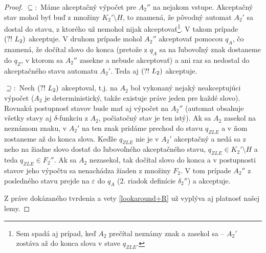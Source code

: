 \begin{proof}
$\subseteq :$ Máme akceptačný výpočet pre $A_2''$ na nejakom vstupe. Akceptačný stav mohol byť buď z množiny $K_2'\setminus H$, to znamená, že pôvodný automat $A_2'$ sa dostal do stavu, z ktorého už nemohol nijak akceptovať\footnote{Sem spadá aj prípad, keď $A_2$ prečítal neznámy znak a zasekol sa -- $A_2'$ zostáva až do konca slova v stave $q_{ZLE}$.}. V takom prípade $\text{(?!~} L_2)$ akceptuje. V druhom prípade mohol $A_2''$ akceptovať pomocou $q_A$, čo znamená, že dočítal slovo do konca (pretože z $q_A$ sa na ľubovoľný znak dostaneme do $q_Z$, v ktorom sa $A_2''$ zasekne a nebude akceptovať) a ani raz sa nedostal do akceptačného stavu automatu $A_2'$. Teda aj $\text{(?!~} L_2)$ akceptuje.

$\supseteq :$ Nech $\text{(?!~} L_2)$ akceptoval, t.j. na $A_2$ bol vykonaný nejaký neakceptujúci výpočet ($A_2$ je deterministický, takže existuje práve jeden pre každé slovo). Rovnakú postupnosť stavov bude mať aj výpočet na $A_2''$ (automat obsahuje všetky stavy aj $\delta$-funkciu z $A_2$, počiatočný stav je ten istý). Ak sa $A_2$ zasekol na neznámom znaku, v $A_2'$ na ten znak pridáme prechod do stavu $q_{ZLE}$ a v ňom zostaneme až do konca slova. Keďže $q_{ZLE}$ nie je v $A_2'$ akceptačný a nedá sa z neho na žiadne slovo dostať do ľubovoľného akceptačného stavu, $q_{ZLE} \in K_2' \setminus H$ a teda $q_{ZLE} \in F_2''$. Ak sa $A_2$ nezasekol, tak dočítal slovo do konca a v postupnosti stavov jeho výpočtu sa nenachádza žiaden z množiny $F_2$. V tom prípade $A_2''$ z posledného stavu prejde na $\varepsilon$ do $q_A$ (2. riadok definície $\delta_2''$) a akceptuje.

Z práve dokázaného tvrdenia a vety \ref{lookaround+R} už vyplýva aj platnosť našej lemy.
\end{proof}

